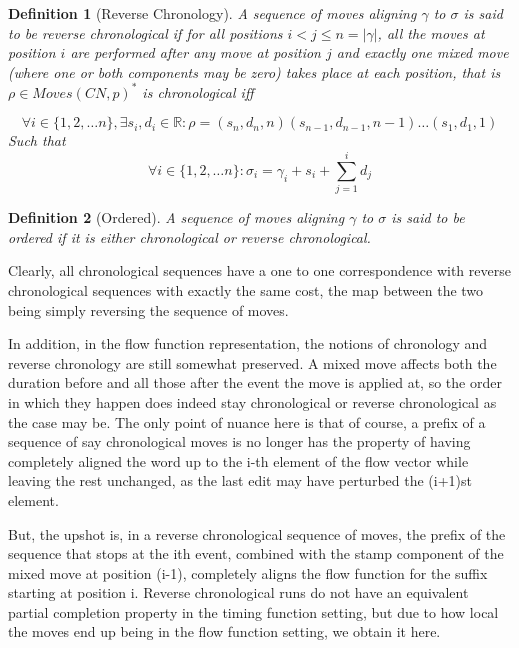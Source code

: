 \documentclass{article}
\theoremstyle{Definition}
\newtheorem{definition}{Definition}
\theoremstyle{definition}
\begin{document}
	\begin{definition}[Reverse Chronology]
	A sequence of moves aligning $\gamma$ to $\sigma$ is said to be \textit{reverse chronological} if for all positions $i < j \leq n = |\gamma|$, all the moves at position $i$ are performed after any move at position $j$ and exactly one mixed move (where one or both components may be zero) takes place at each position, that is $\rho \in Moves(CN, p)^*$ is chronological iff  
	
	$$\forall i \in \{1, 2, \dots n\},  \exists s_i, d_i \in \mathbb{R} : \rho = (s_n, d_n, n)(s_{n-1}, d_{n-1}, n-1)\dots (s_1, d_1, 1) $$
	Such that $$\forall i \in \{1, 2, \dots n\} : \sigma_i = \gamma_i + s_i + \sum_{j=1}^{i} d_j$$
	
	
\end{definition}

	\begin{definition}[Ordered]
	A sequence of moves aligning $\gamma$ to $\sigma$ is said to be \textit{ordered} if it is either chronological or reverse chronological. 
	
\end{definition}

Clearly, all chronological sequences have a one to one correspondence with reverse chronological sequences with exactly the same cost, the map between the two being simply reversing the sequence of moves. 

In addition, in the flow function representation, the notions of chronology and reverse chronology are still somewhat preserved. 
A mixed move affects both the duration before and all those after the event the move is applied at, so the order in which they happen does indeed stay chronological or reverse chronological as the case may be. 
The only point of nuance here is that of course, a prefix of a sequence of say chronological moves is no longer has the property of having completely aligned the word up to the i-th element of the flow vector while leaving the rest unchanged, as the last edit may have perturbed the (i+1)st element. 

But, the upshot is, in a reverse chronological sequence of moves, the prefix of the sequence that stops at the ith event, combined with the stamp component of the mixed move at position (i-1), completely aligns the flow function for the suffix starting at position i. 
Reverse chronological runs do not have an equivalent partial completion property in the timing function setting, but due to how local the moves end up being in the flow function setting, we obtain it here. 
\end{document}

